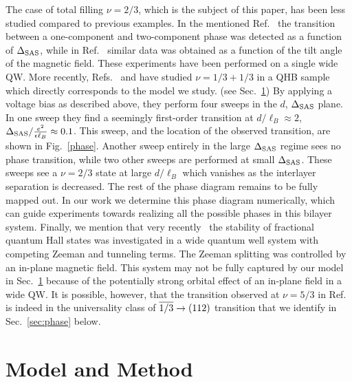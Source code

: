 The case of total filling $\nu=2/3$, which is the subject of this paper, has been less studied compared to previous examples.
In the mentioned Ref.~\cite{Suen94} the transition between a one-component and two-component phase was detected as a function of $\Delta_\textrm{SAS}$, while in Ref.~\cite{Lay97} similar data was obtained as a function of the tilt angle of the magnetic field.
These experiments have been performed on a single wide QW.
More recently, Refs.~\cite{Hirayama2002b} and \cite{Hirayama2004} have studied $\nu=1/3+1/3$ in a QHB sample which directly corresponds to the model we study. (see Sec.~\ref{sec:method})
By applying a voltage bias as described above, they perform four sweeps in the $d$, $\Delta_\textrm{SAS}$ plane. 
In one sweep \cite{Hirayama2002b} they find a seemingly first-order transition at $d/\ell_B\approx2$, $\Delta_\textrm{SAS}/\frac{e^2}{\epsilon\ell_B}\approx0.1$.
This sweep, and the location of the observed transition, are shown in Fig.~\ref{phase}.
Another sweep entirely in the large $\Delta_\textrm{SAS}$ regime sees no phase transition, while two other sweeps are performed at small $\Delta_\textrm{SAS}$.
These sweeps see a $\nu=2/3$ state at large $d/\ell_B$ which vanishes as the interlayer separation is decreased.
The rest of the phase diagram remains to be fully mapped out.
In our work we determine this phase diagram numerically, which can guide experiments towards realizing all the possible phases in this bilayer system.
Finally, we mention that very recently~\cite{Liu15} the stability of fractional quantum Hall states was investigated in a wide quantum well system with competing Zeeman and tunneling terms.
The Zeeman splitting was controlled by an in-plane magnetic field.
This system may not be fully captured by our model in Sec.~\ref{sec:method} because of the potentially strong orbital effect of an in-plane field in a wide QW.
It is possible, however, that the transition observed at $\nu=5/3$ in Ref.~\cite{Liu15} is indeed in the universality class of $\overline{1/3} \to (112)$ transition that we identify in Sec.~\ref{sec:phase} below.  



\section{Model and Method}\label{sec:method}

